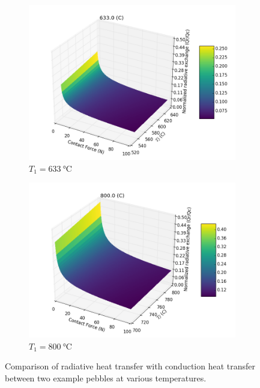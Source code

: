 \begin{figure}[!ht]
    \begin{subfigure}[b]{0.45\textwidth}
        \centering
        \includegraphics[width=\textwidth]{figures/conduction-vs-radiation/633.0.png}
        \caption{$T_1 = \SI{633}{\celsius}$}
    \end{subfigure}
    \begin{subfigure}[b]{0.45\textwidth}
        \centering
        \includegraphics[width=\textwidth]{figures/conduction-vs-radiation/800.0.png}
        \caption{$T_1 = \SI{800}{\celsius}$}
    \end{subfigure}
    \caption{Comparison of radiative heat transfer with conduction heat transfer between two example pebbles at various temperatures.}
\label{fig:qc-vs-qr}
\end{figure}

